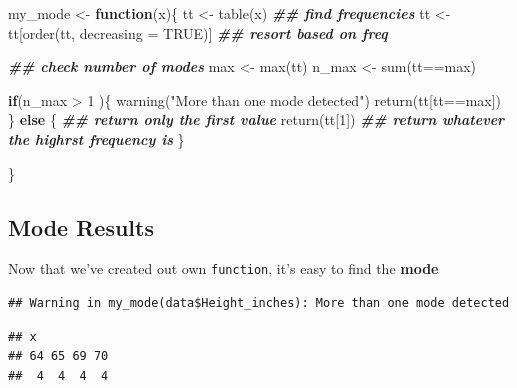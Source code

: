 \documentclass[
]{book}
\newenvironment{Shaded}{\begin{snugshade}}{\end{snugshade}}
\newcommand{\AttributeTok}[1]{\textcolor[rgb]{0.77,0.63,0.00}{#1}}
\newcommand{\ConstantTok}[1]{\textcolor[rgb]{0.00,0.00,0.00}{#1}}
\newcommand{\ControlFlowTok}[1]{\textcolor[rgb]{0.13,0.29,0.53}{\textbf{#1}}}
\newcommand{\DecValTok}[1]{\textcolor[rgb]{0.00,0.00,0.81}{#1}}
\newcommand{\DocumentationTok}[1]{\textcolor[rgb]{0.56,0.35,0.01}{\textbf{\textit{#1}}}}
\newcommand{\FunctionTok}[1]{\textcolor[rgb]{0.00,0.00,0.00}{#1}}
\newcommand{\NormalTok}[1]{#1}
\newcommand{\OtherTok}[1]{\textcolor[rgb]{0.56,0.35,0.01}{#1}}
\newcommand{\SpecialCharTok}[1]{\textcolor[rgb]{0.00,0.00,0.00}{#1}}
\newcommand{\StringTok}[1]{\textcolor[rgb]{0.31,0.60,0.02}{#1}}
\begin{document}
\begin{Shaded}
\begin{Highlighting}[]
\NormalTok{my\_mode }\OtherTok{\textless{}{-}} \ControlFlowTok{function}\NormalTok{(x)\{}
\NormalTok{  tt }\OtherTok{\textless{}{-}} \FunctionTok{table}\NormalTok{(x) }\DocumentationTok{\#\# find frequencies}
\NormalTok{  tt }\OtherTok{\textless{}{-}}\NormalTok{ tt[}\FunctionTok{order}\NormalTok{(tt, }\AttributeTok{decreasing =} \ConstantTok{TRUE}\NormalTok{)] }\DocumentationTok{\#\# resort based on freq}
  
  \DocumentationTok{\#\# check number of modes}
\NormalTok{  max }\OtherTok{\textless{}{-}} \FunctionTok{max}\NormalTok{(tt)}
\NormalTok{  n\_max }\OtherTok{\textless{}{-}} \FunctionTok{sum}\NormalTok{(tt}\SpecialCharTok{==}\NormalTok{max)}
  
  
  \ControlFlowTok{if}\NormalTok{(n\_max }\SpecialCharTok{\textgreater{}} \DecValTok{1}\NormalTok{ )\{}
    \FunctionTok{warning}\NormalTok{(}\StringTok{"More than one mode detected"}\NormalTok{)}
    \FunctionTok{return}\NormalTok{(tt[tt}\SpecialCharTok{==}\NormalTok{max])}
\NormalTok{  \} }\ControlFlowTok{else}\NormalTok{ \{}
    \DocumentationTok{\#\# return only the first value}
    \FunctionTok{return}\NormalTok{(tt[}\DecValTok{1}\NormalTok{]) }\DocumentationTok{\#\# return whatever the highrst frequency is}
\NormalTok{  \}}

  
\NormalTok{\}}
\end{Highlighting}
\end{Shaded}

\hypertarget{mode-results}{%
\subsection{Mode Results}\label{mode-results}}

Now that we've created out own \texttt{function}, it's easy to find the \textbf{mode}

\begin{Shaded}
\end{Shaded}

\begin{verbatim}
## Warning in my_mode(data$Height_inches): More than one mode detected
\end{verbatim}

\begin{verbatim}
## x
## 64 65 69 70 
##  4  4  4  4
\end{verbatim}
\end{document}
